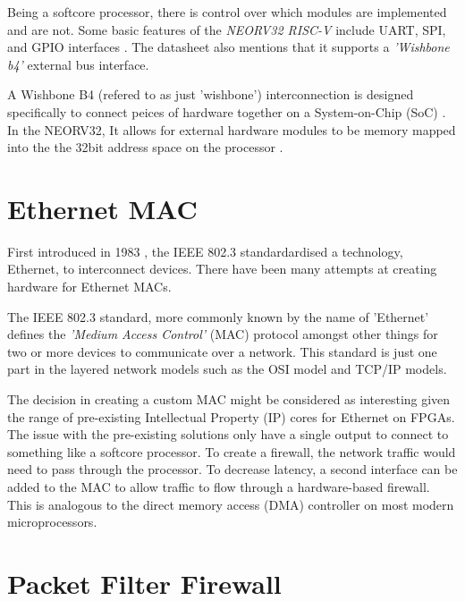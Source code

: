 Being a softcore processor, there is control over which modules are implemented and are not. Some basic features of the \textit{NEORV32 RISC-V} include 
UART, SPI, and GPIO interfaces \cite{neorv32Datasheet}. The datasheet \cite{neorv32Datasheet} also mentions that it supports a \textit{'Wishbone b4'} 
external bus interface. 


A Wishbone B4 (refered to as just 'wishbone') interconnection is designed specifically to connect peices of hardware together on a System-on-Chip (SoC) \cite{WishboneSpec}. In the NEORV32, 
It allows for external hardware modules to be memory mapped into the the 32bit address space on the processor \cite{neorv32Datasheet}.




\section{Ethernet MAC}

First introduced in 1983 \cite{IEEE802.3-2012}, the IEEE 802.3 standardardised a technology, Ethernet, to interconnect devices. There have been 
many attempts at creating hardware for Ethernet MACs. 

The IEEE 802.3 standard\cite{IEEE802.3-2012}, more commonly known by the name of 'Ethernet' defines the \textit{'Medium Access Control'} (MAC) 
protocol amongst other things for two or more devices to communicate over a network. This standard is just one part in the layered network 
models such as the OSI model and TCP/IP models. 






The decision in creating a custom MAC might be considered as interesting given the range of pre-existing Intellectual 
Property (IP) cores for Ethernet on FPGAs. The issue with the pre-existing solutions only have a single output to connect to something like a softcore
processor. To create a firewall, the network traffic would need to pass through the processor. To decrease latency, a second interface can be added 
to the MAC to allow traffic to flow through a hardware-based firewall. This is analogous to the direct memory access (DMA) controller on most modern 
microprocessors. 



\section{Packet Filter Firewall}

